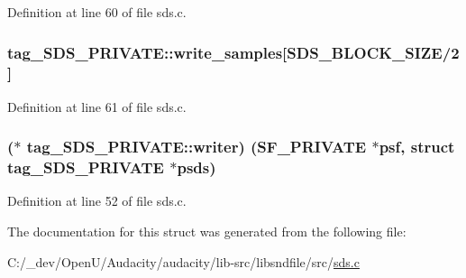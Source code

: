 Definition at line 60 of file sds.\+c.

\subsubsection[{\texorpdfstring{write\+\_\+samples}{write_samples}}]{ tag\+\_\+\+S\+D\+S\+\_\+\+P\+R\+I\+V\+A\+T\+E\+::write\+\_\+samples\mbox{[}{\bf S\+D\+S\+\_\+\+B\+L\+O\+C\+K\+\_\+\+S\+I\+ZE}/2\mbox{]}}\hypertarget{structtag___s_d_s___p_r_i_v_a_t_e_ad2a58fad6ba62b7999eee100657ea06d}{}\label{structtag___s_d_s___p_r_i_v_a_t_e_ad2a58fad6ba62b7999eee100657ea06d}


Definition at line 61 of file sds.\+c.

\subsubsection[{\texorpdfstring{writer}{writer}}]{($\ast$ tag\+\_\+\+S\+D\+S\+\_\+\+P\+R\+I\+V\+A\+T\+E\+::writer) ({\bf S\+F\+\_\+\+P\+R\+I\+V\+A\+TE} $\ast$psf, struct {\bf tag\+\_\+\+S\+D\+S\+\_\+\+P\+R\+I\+V\+A\+TE} $\ast$psds)}\hypertarget{structtag___s_d_s___p_r_i_v_a_t_e_aad18d0b45ff63825e1f13d7f1f7e623c}{}\label{structtag___s_d_s___p_r_i_v_a_t_e_aad18d0b45ff63825e1f13d7f1f7e623c}


Definition at line 52 of file sds.\+c.



The documentation for this struct was generated from the following file\+:\begin{DoxyCompactItemize}
\item 
C\+:/\+\_\+dev/\+Open\+U/\+Audacity/audacity/lib-\/src/libsndfile/src/\hyperlink{sds_8c}{sds.\+c}\end{DoxyCompactItemize}

